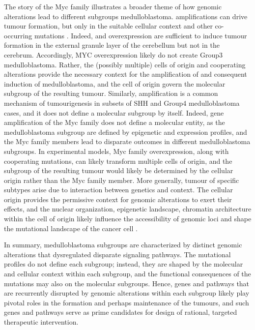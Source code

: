 The story of the Myc family illustrates a broader theme of how genomic alterations lead to different subgroups medulloblastoma.  amplifications can drive tumour formation, but only in the suitable cellular context and other co-occurring mutations . Indeed,  and  overexpression are sufficient to induce tumour formation in the external granule layer of the cerebellum but not in the cerebrum. Accordingly, MYC overexpression likely do not create Group3 medulloblastoma. Rather, the (possibly multiple) cells of origin and cooperating alterations provide the necessary context for the amplification of  and consequent induction of medulloblastoma, and the cell of origin govern the molecular subgroup of the resulting tumour. Similarly,  amplification is a common mechanism of tumourigenesis in subsets of SHH and Group4 medulloblastoma cases, and it does not define a molecular subgroup by itself. Indeed, gene amplification of the Myc family does not define a molecular entity, as the medulloblastoma subgroup are defined by epigenetic and expression profiles, and the Myc family members lead to disparate outcomes in different medulloblastoma subgroups. In experimental models, Myc family overexpression, along with cooperating mutations, can likely transform multiple cells of origin, and the subgroup of the resulting tumour would likely be determined by the cellular origin rather than the Myc family member. More generally, tumour of specific subtypes arise due to interaction between genetics and context. The cellular origin provides the permissive context for genomic alterations to exert their effects, and the nuclear organization, epigenetic landscape, chromatin architecture within the cell of origin likely influence the accessibility of genomic loci and shape the mutational landscape of the cancer cell .

In summary, medulloblastoma subgroups are characterized by distinct genomic alterations that dysregulated disparate signaling pathways. The mutational profiles do not define each subgroup; instead, they are shaped by the molecular and cellular context within each subgroup, and the functional consequences of the mutations may also on the molecular subgroups. Hence, genes and pathways that are recurrently disrupted by genomic alterations within each subgroup likely play pivotal roles in the formation and perhaps maintenance of the tumours, and such genes and pathways serve as prime candidates for design of rational, targeted therapeutic intervention.
